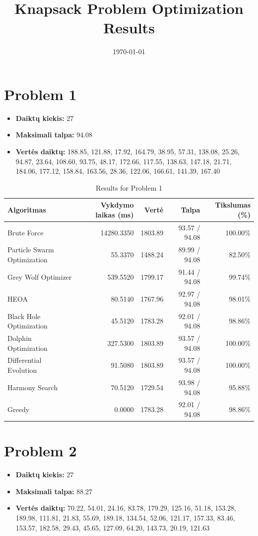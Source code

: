 \documentclass[a4paper,11pt]{article}
\begin{document}
\title{Knapsack Problem Optimization Results}
\date{\today}
\maketitle

\section*{Problem 1}
\begin{itemize}
    \item \textbf{Daiktų kiekis:} 27
    \item \textbf{Maksimali talpa:} 94.08
    \item \textbf{Vertės daiktų:} 188.85, 121.88, 17.92, 164.79, 38.95, 57.31, 138.08, 25.26, 94.87, 23.64, 108.60, 93.75, 48.17, 172.66, 117.55, 138.63, 147.18, 21.71, 184.06, 177.12, 158.84, 163.56, 28.36, 122.06, 166.61, 141.39, 167.40
\end{itemize}

\begin{table}[h!]
\centering
\begin{tabular}{lrrrr}
\toprule
\textbf{Algoritmas} & \textbf{Vykdymo laikas (ms)} & \textbf{Vertė} & \textbf{Talpa} & \textbf{Tikslumas (\%)} \\
\midrule
Brute Force & 14280.3350 & 1803.89 & 93.57 / 94.08 & 100.00\% \\
Particle Swarm Optimization & 55.3370 & 1488.24 & 89.99 / 94.08 & 82.50\% \\
Grey Wolf Optimizer & 539.5520 & 1799.17 & 91.44 / 94.08 & 99.74\% \\
HEOA & 80.5140 & 1767.96 & 92.97 / 94.08 & 98.01\% \\
Black Hole Optimization & 45.5120 & 1783.28 & 92.01 / 94.08 & 98.86\% \\
Dolphin Optimization & 327.5300 & 1803.89 & 93.57 / 94.08 & 100.00\% \\
Differential Evolution & 91.5080 & 1803.89 & 93.57 / 94.08 & 100.00\% \\
Harmony Search & 70.5120 & 1729.54 & 93.98 / 94.08 & 95.88\% \\
Greedy & 0.0000 & 1783.28 & 92.01 / 94.08 & 98.86\% \\
\bottomrule
\end{tabular}
\caption{Results for Problem 1}
\end{table}
\clearpage

\section*{Problem 2}
\begin{itemize}
    \item \textbf{Daiktų kiekis:} 27
    \item \textbf{Maksimali talpa:} 88.27
    \item \textbf{Vertės daiktų:} 70.22, 54.01, 24.16, 83.78, 179.29, 125.16, 51.18, 153.28, 189.98, 111.81, 21.83, 55.69, 189.18, 134.54, 52.06, 121.17, 157.33, 83.46, 153.57, 182.58, 29.43, 45.65, 127.09, 64.20, 143.73, 20.19, 121.63
\end{itemize}
\end{document}
